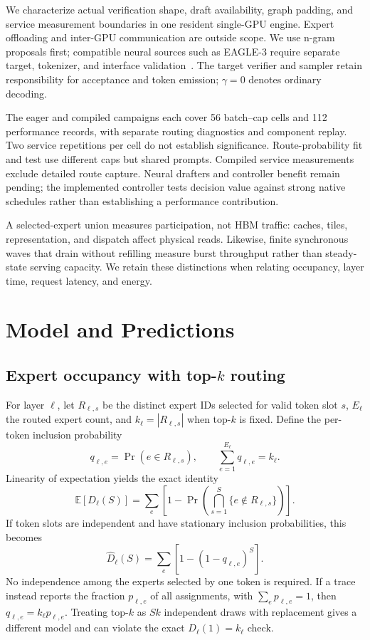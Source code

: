 \documentclass[conference,letterpaper]{IEEEtran}
\begin{document}
We characterize actual verification shape, draft availability, graph padding, and service measurement boundaries in one resident single-GPU engine. Expert offloading and inter-GPU communication are outside scope. We use n-gram proposals first; compatible neural sources such as EAGLE-3 require separate target, tokenizer, and interface validation~\cite{eagle3,eaglerepo}. The target verifier and sampler retain responsibility for acceptance and token emission; $\gamma=0$ denotes ordinary decoding.

The eager and compiled campaigns each cover 56 batch--cap cells and 112 performance records, with separate routing diagnostics and component replay. Two service repetitions per cell do not establish significance. Route-probability fit and test use different caps but shared prompts. Compiled service measurements exclude detailed route capture. Neural drafters and controller benefit remain pending; the implemented controller tests decision value against strong native schedules rather than establishing a performance contribution.

A selected-expert union measures participation, not HBM traffic: caches, tiles, representation, and dispatch affect physical reads. Likewise, finite synchronous waves that drain without refilling measure burst throughput rather than steady-state serving capacity. We retain these distinctions when relating occupancy, layer time, request latency, and energy.

\section{Model and Predictions}
\subsection{Expert occupancy with top-\texorpdfstring{$k$}{k} routing}
For layer $\ell$, let $R_{\ell,s}$ be the distinct expert IDs selected for valid token slot $s$, $E_\ell$ the routed expert count, and $k_\ell=|R_{\ell,s}|$ when top-$k$ is fixed. Define the per-token inclusion probability
\begin{equation}
q_{\ell,e}=\Pr(e\in R_{\ell,s}),\qquad
\sum_{e=1}^{E_\ell}q_{\ell,e}=k_\ell.
\end{equation}
Linearity of expectation yields the exact identity
\begin{equation}
\mathbb E[D_\ell(S)] = \sum_e\left[1-\Pr\!\left(\bigcap_{s=1}^{S}\{e\notin R_{\ell,s}\}\right)\right].
\end{equation}
If token slots are independent and have stationary inclusion probabilities, this becomes
\begin{equation}\label{eq:d}
\widehat D_\ell(S)=\sum_e[1-(1-q_{\ell,e})^S].
\end{equation}
No independence among the experts selected by one token is required. If a trace instead reports the fraction $p_{\ell,e}$ of all assignments, with $\sum_e p_{\ell,e}=1$, then $q_{\ell,e}=k_\ell p_{\ell,e}$. Treating top-$k$ as $Sk$ independent draws with replacement gives a different model and can violate the exact $D_\ell(1)=k_\ell$ check.
\end{document}
